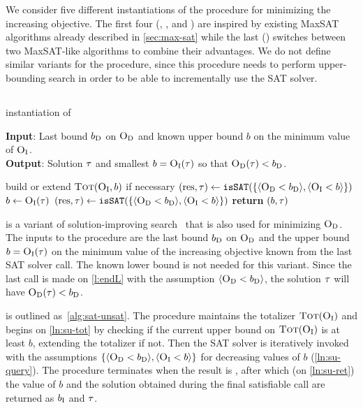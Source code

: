 We consider five different instantiations of the \Min{} procedure for minimizing the increasing objective.
The first four (\satunsat{}, \unsatsat{}, \msu{} and \oll{}) are inspired by existing MaxSAT algorithms already described in \cref{sec:max-sat} while the last (\msh{}) switches between two MaxSAT-like algorithms to combine their advantages.
We do not define similar variants for the \Simpr{} procedure, since this procedure needs to perform upper-bounding search in order to be able to incrementally use the SAT solver.

\subsection{\satunsat{}\label{sec:sat-unsat}}

\begin{algorithm}[t]
  \caption{\satunsat{} instantiation of \Min{}}\label{alg:sat-unsat}
  \textbf{Input}: Last bound $b_{\text{D}}$ on $\textsc{O}_{\text{D}}$ and known upper bound $b$ on the minimum value of $\textsc{O}_{\text{I}}$. \\
  \textbf{Output}: Solution $\tau$ and smallest $b=\textsc{O}_{\text{I}}(\tau)$ so that $\textsc{O}_{\text{D}}(\tau)<b_{\text{D}}$.

  \begin{algorithmic}[1]
    \STATE build or extend $\textsc{Tot}(\textsc{O}_{\text{I}},b)$ if necessary \label{ln:su-tot}
    \STATE $(\text{res},\tau) \gets \texttt{isSAT}(\{\langle \textsc{O}_{\text{D}} < b_{\text{D}} \rangle, \langle \textsc{O}_{\text{I}} < b \rangle\})$
    \WHILE{$\res = \sat$}
      \STATE $b \gets \textsc{O}_{\text{I}}(\tau)$
      \STATE $(\text{res},\tau) \gets \texttt{isSAT}(\{\langle \textsc{O}_{\text{D}} < b_{\text{D}} \rangle, \langle \textsc{O}_{\text{I}} < b \rangle\})$ \label{ln:su-query}
    \ENDWHILE
    \STATE \textbf{return} $(b,\tau)$ \label{ln:su-ret}
  \end{algorithmic}
\end{algorithm}

\satunsat{} is a variant of solution-improving search~\autocites{handbook2-maxsat,DBLP:journals/jsat/BerreP10,DBLP:journals/jsat/EenS06} that is also used for minimizing $\textsc{O}_{\text{D}}$. 
The inputs to the procedure are the last bound $b_{\text{D}}$ on $\textsc{O}_{\text{D}}$ and the upper bound $b=\textsc{O}_{\text{I}}(\tau)$ on the minimum value of the increasing objective known from the last SAT solver call.
The known lower bound is not needed for this variant.
Since the last call is made on \cref{l:endL} with the assumption $\langle \textsc{O}_{\text{D}} < b_{\text{D}} \rangle$, the solution $\tau$ will have $\textsc{O}_{\text{D}}(\tau) < b_{\text{D}}$. 

\satunsat{} is outlined as~\cref{alg:sat-unsat}.
The procedure maintains the totalizer $\textsc{Tot}(\textsc{O}_{\text{I}})$ and begins on \cref{ln:su-tot} by checking if the current upper bound on $\textsc{Tot}(\textsc{O}_{\text{I}})$ is at least $b$, extending the totalizer if not. 
Then the SAT solver is iteratively invoked with the assumptions $\{\langle \textsc{O}_{\text{D}} < b_{\text{D}} \rangle, \langle \textsc{O}_{\text{I}} < b \rangle\}$ for decreasing values of $b$ (\cref{ln:su-query}).
The procedure terminates when the result is \unsat{}, after which (on \cref{ln:su-ret}) the value of $b$ and the solution obtained during the final satisfiable call are returned as $b_{\text{I}}$ and $\tau$.  

